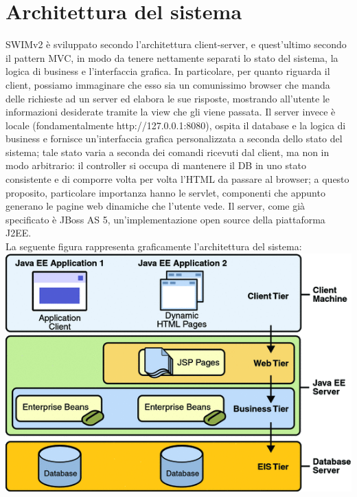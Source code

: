\section{Architettura del sistema}
SWIMv2 è sviluppato secondo l'architettura client-server, e quest'ultimo secondo il pattern MVC, in modo da tenere nettamente separati lo stato del sistema, la logica di
business e l'interfaccia grafica. In particolare, per quanto riguarda il client, possiamo immaginare che esso sia un comunissimo browser che manda delle richieste ad un server ed
elabora le sue risposte, mostrando all'utente le informazioni desiderate tramite la view che gli viene passata. Il server invece è locale (fondamentalmente http://127.0.0.1:8080),
ospita il database e la logica di business e fornisce un'interfaccia grafica personalizzata a seconda dello stato del sistema; tale stato varia a seconda dei comandi ricevuti dal
client, ma non in modo arbitrario: il controller si occupa di mantenere il DB in uno stato consistente e di comporre volta per volta l'HTML da passare al browser; a questo proposito,
particolare importanza hanno le servlet, componenti che appunto generano le pagine web dinamiche che l'utente vede. Il server, come già specificato è JBoss AS 5, un'implementazione
open source della piattaforma J2EE.
\\
La seguente figura rappresenta graficamente l'architettura del sistema:
\vspace{0.5cm}
\center
\includegraphics[scale=2.5]{J2EE.png}
\pagebreak